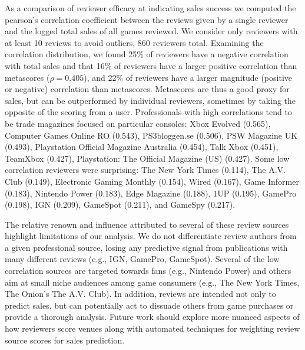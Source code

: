 \documentclass[letterpaper]{article}
\begin{document}
As a comparison of reviewer efficacy at indicating sales success we computed the pearson's correlation coefficient between the reviews given by a single reviewer and the logged total sales of all games reviewed. We consider only reviewers with at least 10 reviews to avoid outliers, 860 reviewers total. Examining the correlation distribution, we found 25\% of reviewers have a negative correlation with total sales and that 16\% of reviewers have a larger positive correlation than metascores ($\rho = 0.405$), and 22\% of reviewers have a larger magnitude (positive or negative) correlation than metascores. Metascores are thus a good proxy for sales, but can be outperformed by individual reviewers, sometimes by taking the opposite of the scoring from a user. Professionals with high correlations tend to be trade magazines focused on particular consoles: Xbox Evolved (0.565), Computer Games Online RO (0.543), PS3bloggen.se (0.506), PSW Magazine UK (0.493), Playstation Official Magazine Australia (0.454), Talk Xbox (0.451), TeamXbox (0.427), Playstation: The Official Magazine (US) (0.427). Some low correlation reviewers were surprising: The New York Times (0.114), The A.V. Club (0.149), Electronic Gaming Monthly (0.154), Wired (0.167), Game Informer (0.183), Nintendo Power (0.183), Edge Magazine (0.188), 1UP (0.195), GamePro (0.198), IGN (0.209), GameSpot (0.211), and GameSpy (0.217). 

The relative renown and influence attributed to several of these review sources highlight limitations of our analysis. We do not differentiate review authors from a given professional source, losing any predictive signal from publications with many different reviews (e.g., IGN, GamePro, GameSpot). Several of the low correlation sources are targeted towards fans (e.g., Nintendo Power) and others aim at small niche audiences among game consumers (e.g., The New York Times, The Onion's The A.V. Club). In addition, reviews are intended not only to predict sales, but can potentially act to dissuade others from game purchases or provide a thorough analysis. Future work should explore more nuanced aspects of how reviewers score venues along with automated techniques for weighting review source scores for sales prediction.
\end{document}

